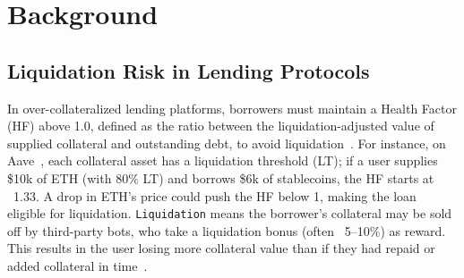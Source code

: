 \documentclass[manuscript,screen,review]{acmart}
\begin{document}
\section{Background}


\subsection{Liquidation Risk in Lending Protocols}

In over-collateralized lending platforms, borrowers must maintain a Health Factor (HF) above 1.0, defined as the ratio between the liquidation-adjusted value of supplied collateral and outstanding debt, to avoid liquidation~\cite{aave_liquidations}.
For instance, on Aave~\cite{aave_v3_technical_paper}, each collateral asset has a liquidation threshold (LT); if a user supplies \$10k of ETH (with 80\% LT) and borrows \$6k of stablecoins, the HF starts at ~1.33. A drop in ETH’s price could push the HF below 1, making the loan eligible for liquidation.
\texttt{Liquidation} means the borrower’s collateral may be sold off by third-party bots, who take a liquidation bonus (often ~5–10\%) as reward.
This results in the user losing more collateral value than if they had repaid or added collateral in time~\cite{qin2021cefi}.
\end{document}
